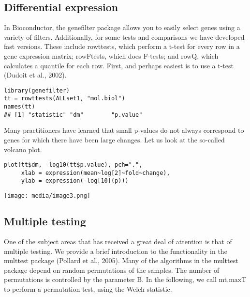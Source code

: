 \hypertarget{differential-expression}{%
\subsection{Differential expression}\label{differential-expression}}

In Bioconductor, the genefilter package allows you to easily select
genes using a variety of filters. Additionally, for some tests and
comparisons we have developed fast versions. These include rowttests,
which perform a t-test for every row in a gene expression matrix;
rowFtests, which does F-tests; and rowQ, which calculates a quantile for
each row. First, and perhaps easiest is to use a t-test (Dudoit et al.,
2002).

\begin{verbatim}
library(genefilter)
tt = rowttests(ALLset1, "mol.biol")
names(tt)
## [1] "statistic" "dm"        "p.value"
\end{verbatim}

Many practitioners have learned that small p-values do not always
correspond to genes for which there have been large changes. Let us look
at the so-called volcano plot.

\begin{verbatim}
plot(tt$dm, -log10(tt$p.value), pch=".",
     xlab = expression(mean~log[2]~fold~change),
     ylab = expression(-log[10](p)))
\end{verbatim}

\texttt{[image: media/image3.png]}

\hypertarget{multiple-testing}{%
\subsection{Multiple testing}\label{multiple-testing}}

One of the subject areas that has received a great deal of attention is
that of multiple testing. We provide a brief introduction to the
functionality in the multtest package (Pollard et al., 2005). Many of
the algorithms in the multtest package depend on random permutations of
the samples. The number of permutations is controlled by the parameter
B. In the following, we call mt.maxT to perform a permutation test,
using the Welch statistic.

